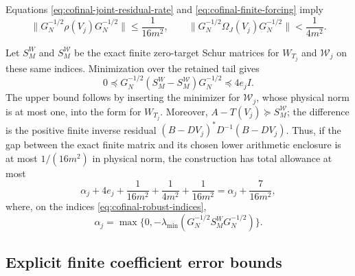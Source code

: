 Equations \eqref{eq:cofinal-joint-residual-rate} and
\eqref{eq:cofinal-finite-forcing} imply
\begin{equation}\label{eq:cofinal-two-residual-budgets}
 \|G_N^{-1/2}\rho(V_j)G_N^{-1/2}\|
 \le\frac1{16m^2},\qquad
 \|G_N^{-1/2}\Omega_J(V_j)G_N^{-1/2}\|
 <\frac1{4m^2}.
\end{equation}

Let $S_M^W$ and $S_M^{\mathcal W}$ be the exact finite
zero-target Schur matrices for $W_{T_j}$ and $\mathcal W_j$
on these same indices. Minimization over the retained tail gives
\begin{equation}\label{eq:cofinal-schur-perturbation}
 0\preceq
 G_N^{-1/2}(S_M^W-S_M^{\mathcal W})G_N^{-1/2}
 \preceq4e_jI.
\end{equation}
The upper bound follows by inserting the minimizer for
$\mathcal W_j$, whose physical norm is at most one, into the
form for $W_{T_j}$. Moreover,
$A-T(V_j)\succeq S_M^{\mathcal W}$; the difference is the
positive finite inverse residual
$(B-DV_j)^*D^{-1}(B-DV_j)$.
Thus, if the gap between the exact finite matrix and its chosen
lower arithmetic enclosure is at most $1/(16m^2)$ in physical
norm, the construction has total allowance at most
\begin{equation}\label{eq:cofinal-robust-bound}
 \alpha_j+4e_j+\frac1{16m^2}+\frac1{4m^2}+\frac1{16m^2}
 =\alpha_j+\frac7{16m^2},
\end{equation}
where, on the indices \eqref{eq:cofinal-robust-indices},
\[
 \alpha_j=\max\{0,-\lambda_{\min}
       (G_N^{-1/2}S_M^WG_N^{-1/2})\}.
\]

\subsection{Explicit finite coefficient error bounds}

